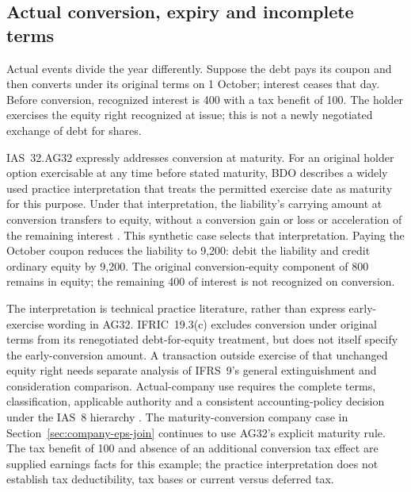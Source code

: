 

\subsection{Actual conversion, expiry and incomplete terms}
\label{sec:eps-actual-conversion}

Actual events divide the year differently. Suppose the debt pays its coupon
and then converts under its original terms on 1 October; interest ceases
that day. Before conversion, recognized interest is 400 with a tax benefit
of 100. The holder exercises the equity right recognized at issue; this is
not a newly negotiated exchange of debt for shares.

IAS~32.AG32 expressly addresses conversion at maturity. For an original
holder option exercisable at any time before stated maturity, BDO describes
a widely used practice interpretation that treats the permitted exercise
date as maturity for this purpose. Under that interpretation, the liability's
carrying amount at conversion transfers to equity, without a conversion gain
or loss or acceleration of the remaining interest
\citep[section 4.5, p.~19]{bdoconvertible2026}.
This synthetic case selects that interpretation. Paying the October coupon
reduces the liability to 9,200: debit the liability and credit ordinary equity
by 9,200. The original conversion-equity component of 800 remains in equity;
the remaining 400 of interest is not recognized on conversion.

The interpretation is technical practice literature, rather than express
early-exercise wording in AG32. IFRIC~19.3(c) excludes conversion under original
terms from its renegotiated debt-for-equity treatment, but does not itself
specify the early-conversion amount. A transaction outside exercise of that
unchanged equity right needs separate analysis of IFRS~9's general
extinguishment and consideration comparison. Actual-company use requires
the complete terms, classification, applicable authority and a consistent
accounting-policy decision under the IAS~8 hierarchy
\citep[IAS~32, paragraphs 28--32 and AG32--35; IFRS~9, paragraphs 3.3.1--3.3.3;
IFRIC~19, paragraphs 2--3; IAS~8, paragraphs 9--13]{eu20231803}.
The maturity-conversion company case in Section~\ref{sec:company-eps-join}
continues to use AG32's explicit maturity rule. The tax benefit of 100 and
absence of an additional conversion tax effect are supplied earnings facts
for this example; the practice interpretation does not establish tax
deductibility, tax bases or current versus deferred tax.

